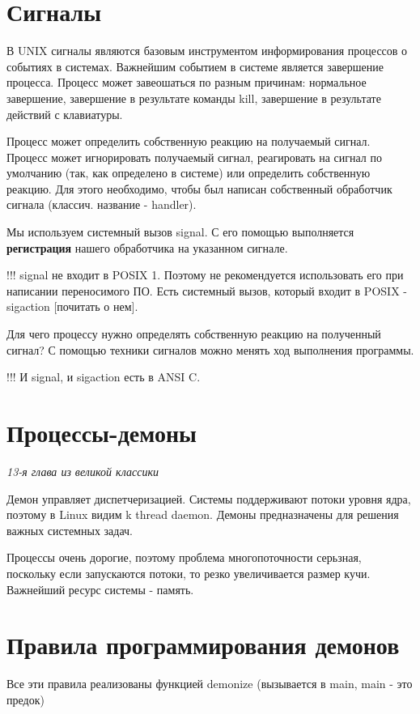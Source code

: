 \documentclass[a4paper, 14pt]{report}
\begin{document}
	\section*{Сигналы}
	
	В UNIX сигналы являются базовым инструментом информирования процессов о событиях в системах. Важнейшим событием в системе является завершение процесса. Процесс может завеошаться по разным причинам: нормальное завершение, завершение в результате команды kill, завершение в результате действий с клавиатуры.
	
	Процесс может определить собственную реакцию на получаемый сигнал. Процесс может игнорировать получаемый сигнал, реагировать на сигнал по умолчанию (так, как определено в системе) или определить собственную реакцию. Для этого необходимо, чтобы был написан собственный обработчик сигнала (классич. название - handler).
	
	Мы используем системный вызов signal. С его помощью выполняется {\bf регистрация} нашего обработчика на указанном сигнале.
	
	!!! signal не входит в POSIX 1. Поэтому не рекомендуется использовать его при написании переносимого ПО. Есть системный вызов, который входит в POSIX - sigaction [почитать о нем].
	
	Для чего процессу нужно определять собственную реакцию на полученный сигнал? С помощью техники сигналов можно менять ход выполнения программы.
	
	!!! И signal, и sigaction есть в ANSI C.
	
	\section*{Процессы-демоны}
	
	{\it 13-я глава из великой классики}
	
	Демон управляет диспетчеризацией. Системы поддерживают потоки уровня ядра, поэтому в Linux видим k thread daemon. Демоны предназначены для решения важных системных задач.
	
	Процессы очень дорогие, поэтому проблема многопоточности серьзная, поскольку если запускаются потоки, то резко увеличивается размер кучи. Важнейший ресурс системы - память.
	
	\section*{Правила программирования демонов}
	
	Все эти правила реализованы функцией demonize (вызывается в main, main - это предок)
	
\end{document}
